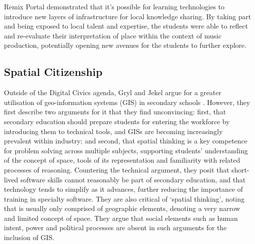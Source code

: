 Remix Portal demonstrated that it's possible for learning technologies to introduce new layers of infrastructure for local knowledge sharing. By taking part and being exposed to local talent and expertise, the students were able to reflect and re-evaluate their interpretation of place within the context of music production, potentially opening new avenues for the students to further explore.

\subsection{Spatial Citizenship}

Outside of the Digital Civics agenda, Gryl and Jekel argue for a greater utilisation of geo-information systems (GIS) in secondary schools \citep{Gryl2012}. However, they first describe two arguments for it that they find unconvincing: first, that secondary education should prepare students for entering the workforce by introducing them to technical tools, and GISs are becoming increasingly prevalent within industry; and second, that spatial thinking is a key competence for problem solving across multiple subjects, supporting students' understanding of the concept of space, tools of its representation and familiarity with related processes of reasoning. Countering the technical argument, they posit that short-lived software skills cannot reasonably be part of secondary education, and that technology tends to simplify as it advances, further reducing the importance of training in specialty software. They are also critical of `spatial thinking', noting that is usually only comprised of geographic elements, denoting a very narrow and limited concept of space. They argue that social elements such as human intent, power and political processes are absent in such arguments for the inclusion of GIS.

